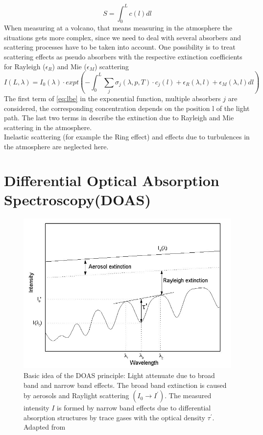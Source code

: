 \documentclass  [
  paper    = a4,
  BCOR     = 10mm,
  twoside,
  fontsize = 12pt,
  fleqn,
  toc      = bibnumbered,
  toc      = listofnumbered,
  numbers  = noendperiod,
  headings = normal,
  listof   = leveldown,
  version  = 3.03
]                                       {scrreprt}
\begin{document}
	\begin{equation}
	S = \int_{0}^{L}c\left(l\right)dl
	\end{equation}
	When measuring at a volcano, that means measuring in the atmosphere the situations gets more complex, since we need to deal with several absorbers and scattering processes have to be taken into account. One possibility is to treat scattering effects as pseudo absorbers with the respective extinction coefficients for Rayleigh ($\epsilon_R$) and  Mie ($\epsilon_M$) scattering
	\begin{equation}
	I\left(L,\lambda\right) = I_{0}\left(\lambda\right)\cdot expt\left(-\int^{L}_{0}\sum_{j}\sigma_{j}\left(\lambda,p,T\right)\cdot
	c_{j}\left(l\right)+\epsilon_R\left(\lambda,l\right)+\epsilon_{M}\left(\lambda,l\right)dl\right)
	\label{eq:lbe}
	\end{equation}
	The first term of \cref{eq:lbe} in the exponential function, multiple absorbers $j$ are considered, the corresponding concentration depends on the position l of the light path.
	The last two terms in describe the extinction due to Rayleigh and Mie scattering in the atmosphere.\\
	Inelastic scattering (for example the Ring effect) and effects due to turbulences in the atmosphere are neglected here.

	\section{Differential Optical Absorption Spectroscopy(DOAS)\label{DOAS}}
		\begin{figure}
			\centering
			\includegraphics[width=0.7\linewidth]{Bilder/Simon/Bilder_Tung/DOAS_Intensity}
			\caption{Basic idea of the DOAS principle: Light attenuate due to broad band and narrow band effects. The broad band extinction is caused by aerosols and Raylight scattering $\left(I_0\rightarrow I^{'}\right)$. The measured intensity $I$ is formed by narrow band effects due to differential absorption structures by trace gases with the optical density $\tau^{'}$. Adapted from \cite{kern2009spectroscopic}}
			\label{fig:doasintensity}
		\end{figure}
		
\end{document}
